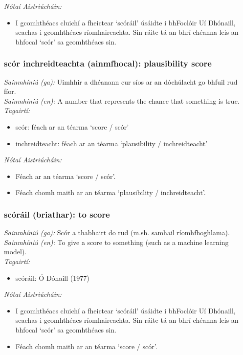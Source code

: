  \noindent \textit{Nótaí Aistriúcháin:}
\begin{itemize}
	\item I gcomhthéacs cluichí a fheictear `scóráil' úsáidte i bhFoclóir Uí Dhónaill, seachas i gcomhthéacs ríomhaireachta. Sin ráite tá an bhrí chéanna leis an bhfocal `scór' sa gcomhthéacs sin.
\end{itemize}


\subsubsection*{scór inchreidteachta (ainmfhocal): plausibility score}
 \noindent \textit{Sainmhíniú (ga):} Uimhhir a dhéanann cur síos ar an dóchúlacht go bhfuil rud fíor.
\\
 \noindent \textit{Sainmhíniú (en):} A number that represents the chance that something is true.
\\
 \noindent \textit{Tagairtí:}
\begin{itemize}
	\item scór: féach ar an téarma `score / scór'
	\item inchreidteacht: féach ar an téarma `plausibility / inchreidteacht'
\end{itemize}

 \noindent \textit{Nótaí Aistriúcháin:}
\begin{itemize}
	\item Féach ar an téarma `score / scór'.
	\item Féach chomh maith ar an téarma `plausibility / inchreidteacht'.
\end{itemize}


\subsubsection*{scóráil (briathar): to score}
 \noindent \textit{Sainmhíniú (ga):} Scór a thabhairt do rud (m.sh. samhail ríomhfhoghlama).
\\
 \noindent \textit{Sainmhíniú (en):} To give a score to something (such as a machine learning model).
\\
 \noindent \textit{Tagairtí:}
\begin{itemize}
	\item scóráil: Ó Dónaill (1977) \cite{odonaill}
\end{itemize}

 \noindent \textit{Nótaí Aistriúcháin:}
\begin{itemize}
	\item I gcomhthéacs cluichí a fheictear `scóráil' úsáidte i bhFoclóir Uí Dhónaill, seachas i gcomhthéacs ríomhaireachta. Sin ráite tá an bhrí chéanna leis an bhfocal `scór' sa gcomhthéacs sin.
	\item Féach chomh maith ar an téarma `score / scór'.
\end{itemize}


